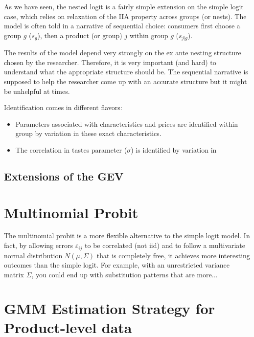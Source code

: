 \documentclass[12pt]{report}
\begin{document}
As we have seen, the nested logit is a fairly simple extension on the simple logit case, which relies on relaxation of the IIA property across groups (or nests). The model is often told in a narrative of sequential choice: consumers first choose a group $g$ ($s_g$), then a product (or group) $j$ within group $g$ ($s_{j\vert g}$). 

The results of the model depend very strongly on the ex ante nesting structure chosen by the researcher. Therefore, it is very important (and hard) to understand what the appropriate structure should be. The sequential narrative is supposed to help the researcher come up with an accurate structure but it might be unhelpful at times.

Identification comes in different flavors:\begin{itemize}
\item Parameters associated with characteristics and prices are identified within group by variation in these exact characteristics.
\item The correlation in tastes parameter ($\sigma$) is identified by variation in 
\end{itemize}

\subsection{Extensions of the GEV}



\section{Multinomial Probit}

The multinomial probit is a more flexible alternative to the simple logit model. In fact, by allowing errors $\varepsilon_{ij}$ to be correlated (not iid) and to follow a multivariate normal distribution $N(\mu, \Sigma)$ that is completely free, it achieves more interesting outcomes than the simple logit. For example, with an unrestricted variance matrix $\Sigma$, you could end up with substitution patterns that are more...

\section{GMM Estimation Strategy for Product-level data}
\end{document}
